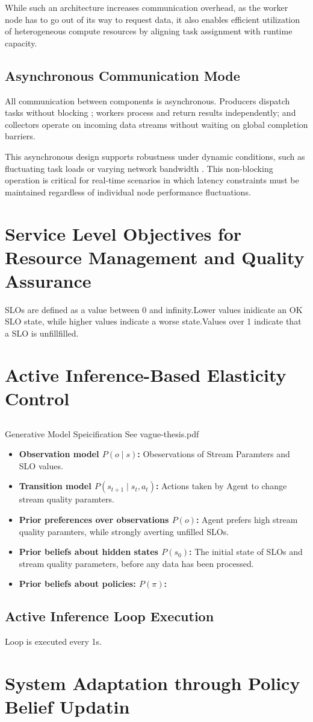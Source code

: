 While such an architecture increases communication overhead, as the worker node has to go out of its way to request data, it also enables efficient utilization of heterogeneous compute resources by aligning task assignment with runtime capacity.

\subsection{Asynchronous Communication Mode}
All communication between components is asynchronous. Producers dispatch tasks without blocking \cite{lauener_how_2018}; workers process and return results independently; and collectors operate on incoming data streams without waiting on global completion barriers.

This asynchronous design supports robustness under dynamic conditions, such as fluctuating task loads or varying network bandwidth \cite{nguyen_octopinf_2025}. This non-blocking operation is critical for real-time scenarios in which latency constraints must be maintained regardless of individual node performance fluctuations.


\section{Service Level Objectives for Resource Management and Quality Assurance}
SLOs are defined as a value between 0 and infinity.Lower values inidicate an OK SLO state, while higher values indicate a worse state.Values over 1 indicate that a SLO is unfillfilled.

\section{Active Inference-Based Elasticity Control}
\subsection{}{Generative Model Speicification}
See vague-thesis.pdf


\begin{itemize}
  \item \textbf{Observation model \(P(o \mid s)\):} Obeservations of Stream Paramters and SLO values.
  \item \textbf{Transition model \(P(s_{t+1} \mid s_t,a_t)\):} Actions taken by Agent to change stream quality paramters.
  \item \textbf{Prior preferences over observations \(P(o)\):} Agent prefers high stream quality paramters, while strongly averting unfilled SLOs.
  \item \textbf{Prior beliefs about hidden states \(P(s_0)\):} The initial state of SLOs and stream quality parameters, before any data has been processed.
  \item \textbf{Prior beliefs about policies: \(P(\pi)\):} 
\end{itemize}

\subsection{Active Inference Loop Execution}
Loop is executed every 1s.

\section{System Adaptation through Policy Belief Updatin}